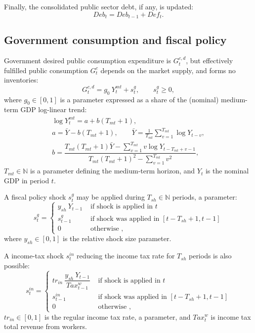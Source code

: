 \documentclass[a4paper,11pt]{article}
\begin{document}
\begin{appendices}
Finally, the consolidated public sector debt, if any, is updated:
\begin{equation}
	Deb_t = Deb_{t-1} + Def_t.
\end{equation}


\subsection*{Government consumption and fiscal policy}

Government desired public consumption expenditure is $G_t^{c,d}$, but effectively fulfilled public consumption $G_t^c$ depends on the market supply, and forms no inventories:
\begin{equation}
	G_t^{c,d} = g_0 ~ Y_t^{mt} + s_t^g, \qquad s_t^g \ge 0,
\end{equation}
where $g_0 \in [0, 1]$ is a parameter expressed as a share of the (nominal) medium-term GDP log-linear trend:
\begin{equation}
	\begin{gathered}
		\log{ Y_t^{mt} } = a + b \left( T_{mt} + 1 \right),\\
		a = \bar{Y} - b \left( T_{mt} + 1 \right),
		\qquad \bar{Y} = \frac{ 1 }{ T_{mt} } \sum_{ v = 1 }^{ T_{mt} } \log{ Y_{t-v} },\\
		b = \dfrac{ T_{mt} \left( T_{mt} + 1 \right) \bar{Y} - \sum_{ v = 1 }^{ T_{mt} } v \log{ Y_{t-T_{mt}+v-1} } }{ T_{mt} \left( T_{mt} + 1 \right)^2 - \sum_{ v = 1 }^{ T_{mt} } v^2 },
	\end{gathered}
\end{equation}
$T_{mt} \in \mathbb{N}$ is a parameter defining the medium-term horizon, and $Y_t$ is the nominal GDP in period $t$.

A fiscal policy shock $s_t^g$ may be applied during $T_{sh} \in \mathbb{N}$ periods, a parameter:
\begin{equation}
	s_t^g =
	\begin{cases}
		y_{sh} ~ Y_{t-1} & \mbox{ if shock is applied in } t \\
		s_{t-1}^g & \mbox{ if shock was applied in } \left[ t - T_{sh} + 1, t - 1 \right] \\
		0 & \mbox{ otherwise },
	\end{cases}
\end{equation}
where $y_{sh} \in [0, 1]$ is the relative shock size parameter.

A income-tax shock $s_t^{in}$ reducing the income tax rate for $T_{sh}$ periods is also possible:
\begin{equation}
	s_t^{in} =
	\begin{cases}
		{tr}_{in} ~ \dfrac{ y_{sh} ~ Y_{t-1} }{ Tax_{t-1}^w } & \mbox{ if shock is applied in } t \\
		s_{t-1}^{in} & \mbox{ if shock was applied in } \left[ t - T_{sh} + 1, t - 1 \right] \\
		0 & \mbox{ otherwise },
	\end{cases}
\end{equation}
${tr}_{in} \in [0, 1]$ is the regular income tax rate, a parameter, and $Tax_t^w$ is income tax total revenue from workers.



\end{appendices}
\end{document}
